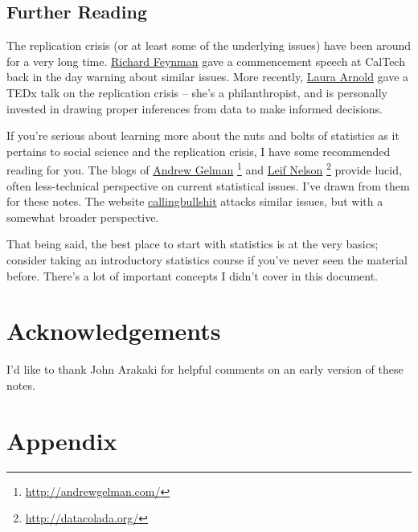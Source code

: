 \documentclass{tufte-handout}
\begin{document}
\subsection{Further Reading}
\label{sec:org0a6530b}
The replication crisis (or at least some of the underlying issues) have been
around for a very long time. \href{http://calteches.library.caltech.edu/51/2/CargoCult.htm}{Richard Feynman} gave a commencement speech at
CalTech back in the day warning about similar issues. More recently, \href{https://www.youtube.com/watch?v=J5A5o9I7rnA\&list=WL\&index=21}{Laura
Arnold} gave a TEDx talk on the replication crisis -- she's a philanthropist, and
is personally invested in drawing proper inferences from data to make informed
decisions.

If you're serious about learning more about the nuts and bolts of statistics as
it pertains to social science and the replication crisis, I have some
recommended reading for you. The blogs of \href{http://andrewgelman.com/}{Andrew Gelman}
\footnote{\url{http://andrewgelman.com/}} and \href{http://datacolada.org/}{Leif Nelson} \footnote{\url{http://datacolada.org/}}
provide lucid, often less-technical perspective on current statistical issues.
I've drawn from them for these notes. The website \href{http://callingbullshit.org/syllabus.html}{callingbullshit} attacks
similar issues, but with a somewhat broader perspective.

That being said, the best place to start with statistics is at the very basics;
consider taking an introductory statistics course if you've never seen the
material before. There's a lot of important concepts I didn't cover in this
document.

\section{Acknowledgements}
\label{sec:org6006a20}
I'd like to thank John Arakaki for helpful comments on an early version of these
notes.




\section{Appendix}
\label{sec:org5a81e8e}
\end{document}
